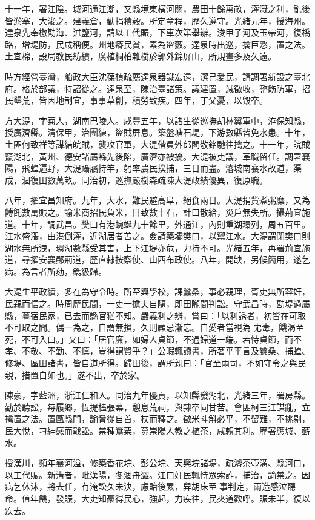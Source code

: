 \begin{pinyinscope}
十一年，署江陰。城河通江潮，又縣境東橫河關，農田十餘萬畝，灌溉之利，亂後皆淤塞，大浚之。建義倉，勸捐積穀。所定章程，歷久遵守。光緒元年，授海州。達泉先奉檄勘海、沭鹽河，請以工代賑，下車次第舉辦。浚甲子河及玉帶河，復橋路，增堤防，民咸稱便。州地瘠民貧，素為盜藪。達泉時出巡，擒巨憝，置之法。土宜棉，設局教民紡績，廣植桐柏雜樹於郭外錦屏山，所規畫多及久遠。

時方經營臺灣，船政大臣沈葆楨疏薦達泉器識宏遠，潔己愛民，請調署新設之臺北府。格於部議，特詔從之。達泉至，陳治臺諸策。議建置，減徵收，整飭防軍，招民墾荒，皆因地制宜，事事草創，積勞致疾。四年，丁父憂，以毀卒。

方大湜，字菊人，湖南巴陵人。咸豐五年，以諸生從巡撫胡林翼軍中，洊保知縣，授廣濟縣。清保甲，治團練，盜賊屏息。築盤塘石堤，下游數縣皆免水患。十年，土匪何致祥等謀結皖賊，襲攻官軍，大湜偕員外郎閻敬銘馳往擒之。十一年，皖賊竄湖北，黃州、德安諸屬縣先後陷，廣濟亦被擾。大湜被吏議，革職留任。調署襄陽，飛蝗遍野，大湜躡屩持竿，躬率農民撲捕，三日而盡。濬城南襄水故道，渠成，涸復田數萬畝。同治初，巡撫嚴樹森疏陳大湜政績優異，復原職。

八年，擢宜昌知府。九年，大水，難民避高阜，絕食兩日。大湜捐貲煮粥糜，又為餺飥數萬賑之。諭米商招民負米，日致數十石，計口散給，災戶無失所。攝荊宜施道。十年，調武昌。樊口有港蜿蜒九十餘里，外通江，內則重湖環列，周五百里。江水盛漲，由港倒灌，近湖居者苦之。僉請築壩樊口，以禦江水。大湜謂閉樊口則湖水無所洩，環湖數縣受其害，上下江堤亦危，力持不可。光緒五年，再署荊宜施道，尋擢安襄鄖荊道，歷直隸按察使、山西布政使。八年，開缺，另候簡用，遂乞病。為言者所劾，鐫級歸。

大湜生平政績，多在為守令時。所至興學校，課蠶桑，事必親理，胥吏無所容奸，民親而信之。時周歷民間，一吏一擔夫自隨，即田隴間判訟。守武昌時，勘堤過屬縣，暮宿民家，已去而縣官猶不知。嚴義利之辨，嘗曰：「以利誘者，初皆在可取不可取之間。偶一為之，自謂無損，久則顧忌漸忘。自愛者當視為冘毒，饑渴至死，不可入口。」又曰：「居官廉，如婦人貞節，不過婦道一端。若恃貞節，而不孝、不敬、不勤、不慎，豈得謂賢乎？」公暇輒讀書，所著平平言及蠶桑、捕蝗、修堤、區田諸書，皆自道所得。歸田後，謂所親曰：「官至兩司，不如守令之與民親，措置自如也。」遂不出，卒於家。

陳豪，字藍洲，浙江仁和人。同治九年優貢，以知縣發湖北，光緒三年，署房縣。勤於聽訟，每履鄉，恆提榼張幕，憩息荒祠，與隸卒同甘苦。會匪柯三江謀亂，立擒置之法。置匭縣門，諭脅從自首，杖而釋之。徵米斗斛必平，不留難，不挑剔，民大悅，刁紳感而戢訟。禁種鶯粟，募崇陽人教之植茶，咸賴其利。歷署應城、蘄水。

授漢川，頻年襄河溢，修築香花垸、彭公垸、天興垸諸堤，疏濬茶壺溝、縣河口，以工代賑。新溝者，毗漢陽，冬涸舟澀。江口奸民輒恃眾索詐，捕治，諭禁之。因病乞休沐，將去任，有淹訟久未決，慮貽後累，舁胡床至事判定，兩造感泣聽命。值年饑，發賑，大吏知豪得民心，強起，力疾往，民夾道歡呼。賑未半，復以疾去。


\end{pinyinscope}
